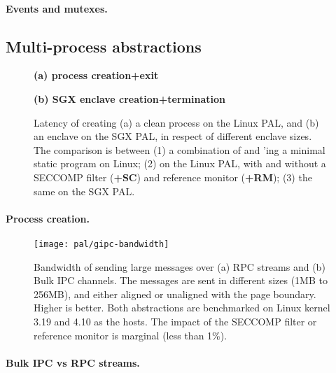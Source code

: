 \paragraph{Events and mutexes.}


\subsection{Multi-process abstractions}


\begin{figure*}[t!]
\centering
\footnotesize
{}
\parbox{0.59\textwidth}{\centering\bf (a) process creation+exit}
\parbox{0.39\textwidth}{\centering\bf (b) SGX enclave creation+termination}
\caption{Latency of creating (a) a clean process on the Linux PAL, and (b) an enclave on the SGX PAL, in respect of different enclave sizes.
The comparison is between (1) a combination of  and 'ing a minimal static program on Linux; (2)  on the Linux PAL, with and without a SECCOMP filter ({\bf +SC}) and reference monitor ({\bf +RM}); (3) the same \hostapi{} on the SGX PAL.}
\label{fig:eval:pal:proc-latency}
\end{figure*}

\paragraph{Process creation.}




\begin{figure*}[t!]
\centering
\footnotesize
\texttt{[image: pal/gipc-bandwidth]}
\caption{Bandwidth of sending large messages over (a) RPC streams and (b) Bulk IPC channels. The messages are sent in different sizes (1MB to 256MB), and either aligned or unaligned with the page boundary.
Higher is better. Both abstractions are benchmarked on Linux kernel 3.19 and 4.10 as the hosts. The impact of the SECCOMP filter or reference monitor is marginal (less than 1\%).}
\label{fig:eval:pal:gipc-bandwidth}
\end{figure*}


\paragraph{Bulk IPC vs RPC streams.}




